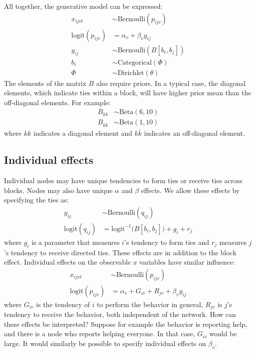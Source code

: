 \documentclass[reqno,12pt,a4paper]{amsart}
\begin{document}
All together, the generative model can be expressed:
\begin{align*}
	x_{ijvt} &\sim \mathrm{Bernoulli}( p_{ijv} )\\
	\mathrm{logit}(p_{ijv}) &= \alpha_v + \beta_v y_{ij}\\
	y_{ij} &\sim \mathrm{Bernoulli}( B[b_i,b_j] )\\
	b_i &\sim \mathrm{Categorical}( \Phi )\\
	\Phi &\sim \mathrm{Dirichlet}( \theta )
\end{align*}
The elements of the matrix $B$ also require priors. In a typical case, the diagonal elements, which indicate ties within a block, will have higher prior mean than the off-diagonal elements. For example:
\begin{align*}
	B_{kk} &\sim \mathrm{Beta}( 6 , 10 )\\
	B_{k \bar k} &\sim \mathrm{Beta}( 1 , 10 )
\end{align*}
where $kk$ indicates a diagonal element and $k \bar k$ indicates an off-diagonal element. 

\subsection{Individual effects}

Individual nodes may have unique tendencies to form ties or receive ties across blocks. Nodes may also have unique $\alpha$ and $\beta$ effects. We allow these effects by specifying the ties as:
\begin{align*}
	y_{ij} &\sim \mathrm{Bernoulli}( q_{ij} )\\
	\mathrm{logit}(q_{ij}) &= \mathrm{logit}^{-1} \big( B[b_i,b_j] \big) + g_i + r_j
\end{align*}
where $g_i$ is a parameter that measures $i$'s tendency to form ties and $r_j$ measures $j$'s tendency to receive directed ties. These effects are in addition to the block effect. Individual effects on the observable $x$ variables have similar influence:
\begin{align*}
	x_{ijvt} &\sim \mathrm{Bernoulli}( p_{ijv} )\\
	\mathrm{logit}(p_{ijv}) &= \alpha_v + G_{iv} + R_{jv} + \beta_v y_{ij} 
\end{align*}
where $G_{iv}$ is the tendency of $i$ to perform the behavior in general, $R_{jv}$ is $j$'s tendency to receive the behavior, both independent of the network. How can these effects be interpreted? Suppose for example the behavior is reporting help, and there is a node who reports helping everyone. In that case, $G_{iv}$ would be large. It would similarly be possible to specify individual effects on $\beta_{v}$.
\end{document}
